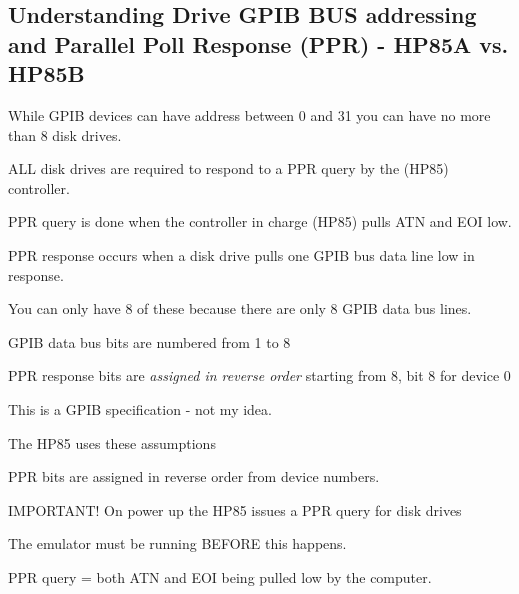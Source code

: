  



\subsection*{Understanding Drive G\+P\+IB B\+US addressing and Parallel Poll Response (P\+PR) -\/ H\+P85A vs. H\+P85B}


\begin{DoxyItemize}
\item While G\+P\+IB devices can have address between 0 and 31 you can have no more than 8 disk drives.
\item A\+LL disk drives are required to respond to a P\+PR query by the (H\+P85) controller.
\begin{DoxyItemize}
\item P\+PR query is done when the controller in charge (H\+P85) pulls A\+TN and E\+OI low.
\item P\+PR response occurs when a disk drive pulls one G\+P\+IB bus data line low in response.
\begin{DoxyItemize}
\item You can only have 8 of these because there are only 8 G\+P\+IB data bus lines.
\begin{DoxyItemize}
\item G\+P\+IB data bus bits are numbered from 1 to 8
\item P\+PR response bits are {\itshape assigned in reverse order} starting from 8, bit 8 for device 0
\begin{DoxyItemize}
\item This is a G\+P\+IB specification -\/ not my idea.
\end{DoxyItemize}
\item The H\+P85 uses these assumptions
\begin{DoxyItemize}
\item P\+PR bits are assigned in reverse order from device numbers.
\end{DoxyItemize}
\end{DoxyItemize}
\end{DoxyItemize}
\end{DoxyItemize}
\item I\+M\+P\+O\+R\+T\+A\+N\+T! On power up the H\+P85 issues a P\+PR query for disk drives
\begin{DoxyItemize}
\item The emulator must be running B\+E\+F\+O\+RE this happens.
\item P\+PR query = both A\+TN and E\+OI being pulled low by the computer.

\end{DoxyItemize}
\end{DoxyItemize}
